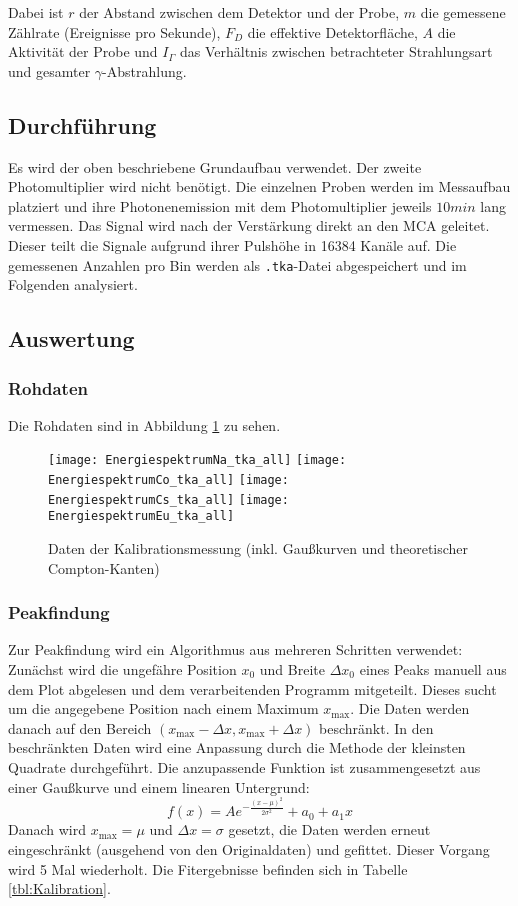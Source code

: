 \documentclass{../Misc/MontavonLaTeX/Montavon}
\newcommand{\halfwidth}{0.48\textwidth}
\begin{document}
Dabei ist $r$ der Abstand zwischen dem Detektor und der Probe, $m$ die gemessene Zählrate (Ereignisse pro Sekunde), $F_D$ die effektive Detektorfläche, $A$ die Aktivität der Probe und $I_\Gamma$ das Verhältnis zwischen betrachteter Strahlungsart und gesamter $\gamma$-Abstrahlung.

\subsection{Durchführung}
Es wird der oben beschriebene Grundaufbau verwendet. Der zweite Photomultiplier wird nicht benötigt. Die einzelnen Proben werden im Messaufbau platziert und ihre Photonenemission mit dem Photomultiplier jeweils $10 \unit{min}$ lang  vermessen. Das Signal wird nach der  Verstärkung direkt an den MCA geleitet. Dieser teilt die Signale aufgrund ihrer Pulshöhe in 16384 Kanäle auf. Die gemessenen Anzahlen pro Bin werden als \texttt{.tka}-Datei abgespeichert und im Folgenden analysiert.

\subsection{Auswertung}
\subsubsection{Rohdaten}
Die Rohdaten sind in Abbildung \ref{fig:Kalib} zu sehen.
\begin{figure}[htbp]
\centering
\texttt{[image: EnergiespektrumNa\_tka\_all]}
\texttt{[image: EnergiespektrumCo\_tka\_all]}
\texttt{[image: EnergiespektrumCs\_tka\_all]}
\texttt{[image: EnergiespektrumEu\_tka\_all]}
\caption{Daten der Kalibrationsmessung (inkl. Gaußkurven und theoretischer Compton-Kanten)}
\label{fig:Kalib}
\end{figure}

\subsubsection{Peakfindung}
Zur Peakfindung wird ein Algorithmus aus mehreren Schritten verwendet:
Zunächst wird die ungefähre Position $x_0$ und Breite $\Delta x_0$ eines Peaks manuell aus dem Plot abgelesen und dem verarbeitenden Programm mitgeteilt. Dieses sucht um die angegebene Position nach einem Maximum $x_\textrm{max}$. 
Die Daten werden danach auf den Bereich $(x_\textrm{max} - \Delta x, x_\textrm{max} + \Delta x)$ beschränkt.
In den beschränkten Daten wird eine Anpassung durch die Methode der kleinsten Quadrate durchgeführt. Die anzupassende Funktion ist zusammengesetzt aus einer Gaußkurve und einem linearen Untergrund:
\[
	f(x) = A e^{-\frac{(x-\mu)^2}{2 \sigma^2}} + a_0 + a_1 x
\]
Danach wird $x_\textrm{max} = \mu$ und $\Delta x = \sigma$ gesetzt, die Daten werden erneut eingeschränkt (ausgehend von den Originaldaten) und gefittet.
Dieser Vorgang wird 5 Mal wiederholt. Die Fitergebnisse befinden sich in Tabelle \ref{tbl:Kalibration}.
\end{document}
